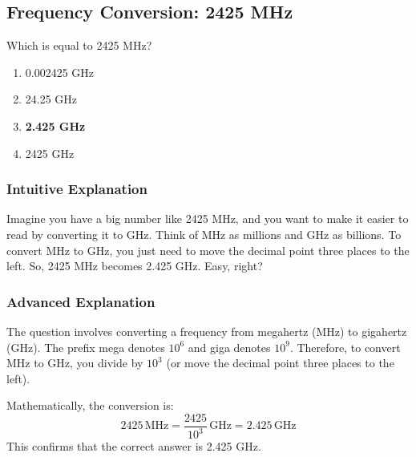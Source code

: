 \subsection{Frequency Conversion: 2425 MHz}
\label{T5B13}

\begin{tcolorbox}[colback=gray!10!white,colframe=black!75!black,title=T5B13]
Which is equal to 2425 MHz?
\begin{enumerate}[noitemsep]
    \item 0.002425 GHz
    \item 24.25 GHz
    \item \textbf{2.425 GHz}
    \item 2425 GHz
\end{enumerate}
\end{tcolorbox}

\subsubsection*{Intuitive Explanation}
Imagine you have a big number like 2425 MHz, and you want to make it easier to read by converting it to GHz. Think of MHz as millions and GHz as billions. To convert MHz to GHz, you just need to move the decimal point three places to the left. So, 2425 MHz becomes 2.425 GHz. Easy, right?

\subsubsection*{Advanced Explanation}
The question involves converting a frequency from megahertz (MHz) to gigahertz (GHz). The prefix mega denotes \(10^6\) and giga denotes \(10^9\). Therefore, to convert MHz to GHz, you divide by \(10^3\) (or move the decimal point three places to the left). 

Mathematically, the conversion is:
\[
2425 \, \text{MHz} = \frac{2425}{10^3} \, \text{GHz} = 2.425 \, \text{GHz}
\]
This confirms that the correct answer is 2.425 GHz.